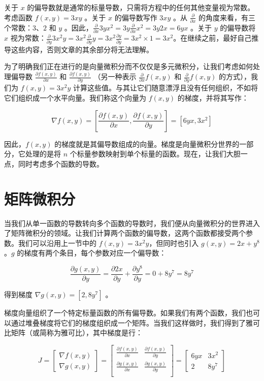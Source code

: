 \documentclass{ctexart}
\begin{document}
关于 $x$ 的偏导数就是通常的标量导数，只需将方程中的任何其他变量视为常数。考虑函数 $f(x, y) = 3xy$ 。关于 $x$ 的偏导数写作 $3xy$ 。从 $\frac{\partial}{\partial x}$ 的角度来看，有三个常数：$3$、$2$ 和 $y$ 。因此，$\frac{\partial}{\partial x} 3yx^2 = 3y\frac{\partial}{\partial x} x^2 = 3y2x = 6yx$ 。关于 $y$ 的偏导数将 $x$ 视为常数：$\frac{\partial}{\partial y} 3x^2y = 3x^2\frac{\partial}{\partial y} y = 3x^2\frac{\partial y}{\partial y} = 3x^2 \times 1 = 3x^2$。在继续之前，最好自己推导这些内容，否则文章的其余部分将无法理解。

为了明确我们正在进行的是向量微积分而不仅仅是多元微积分，让我们考虑如何处理偏导数 $\frac{\partial f(x,y)}{\partial x}$ 和 $\frac{\partial f(x,y)}{\partial y}$ （另一种表示 $\frac{\partial}{\partial x}f(x,y)$ 和 $\frac{\partial }{\partial y}f(x,y)$ 的方式），我们为 $f(x, y) = 3x^2y$ 计算这些值。与其让它们随意漂浮且没有任何组织，不如将它们组织成一个水平向量。我们称这个向量为 $f(x, y)$ 的梯度，并将其写作：

\[\nabla f(x,y)  = [ \frac{\partial f(x,y)}{\partial x}, \frac{\partial f(x,y)}{\partial y}] = [6yx, 3x^2]\]

因此，$f(x, y)$ 的梯度就是其偏导数组成的向量。梯度是向量微积分世界的一部分，它处理的是将 $n$ 个标量参数映射到单个标量的函数。现在，让我们大胆一点，同时考虑多个函数的导数。

\section{矩阵微积分}

当我们从单一函数的导数转向多个函数的导数时，我们便从向量微积分的世界进入了矩阵微积分的领域。让我们计算两个函数的偏导数，这两个函数都接受两个参数。我们可以沿用上一节中的 $f(x, y) = 3x^2y$，但同时也引入 $g(x, y) = 2x + y^8$。$g$ 的梯度有两个条目，每个参数对应一个偏导数：

\[\frac{\partial g(x,y)}{\partial y} = \frac{\partial 2x}{\partial y} + \frac{\partial y^8}{\partial y} = 0 + 8y^7 = 8y^7\]

得到梯度 $\nabla g(x,y) = [2, 8y^7]$ 。

梯度向量组织了一个特定标量函数的所有偏导数。如果我们有两个函数，我们也可以通过堆叠梯度将它们的梯度组织成一个矩阵。当我们这样做时，我们得到了雅可比矩阵（或简称为雅可比），其中梯度是行：

\[J =
\begin{bmatrix}
	\nabla f(x,y)\\
	\nabla g(x,y)
\end{bmatrix} = \begin{bmatrix}
 \frac{\partial f(x,y)}{\partial x} & \frac{\partial f(x,y)}{\partial y}\\
 \frac{\partial g(x,y)}{\partial x} & \frac{\partial g(x,y)}{\partial y}\\
\end{bmatrix} = \begin{bmatrix}
	6yx & 3x^2\\
	2 & 8y^7
\end{bmatrix}\]
\end{document}

